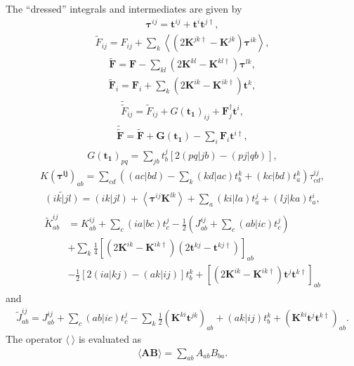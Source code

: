 The ``dressed'' integrals and intermediates are given by
\begin{align}
  \pmb{\tau}^{ij} = \pmb{t}^{ij}+\pmb{t}^i\pmb{t}^{j\dagger},
\end{align}
\begin{align}
  \tilde{F}_{ij} = F_{ij} + \sum_k \left\langle {(2\pmb{K}^{jk\dagger}-\pmb{K}^{jk})}\pmb{\tau}^{ik}\right\rangle,
\end{align}
\begin{align}
  \pmb{\tilde{F}} = \pmb{F} - {\sum_{kl}\left(2\pmb{K}^{kl}-\pmb{K}^{kl\dagger}\right)\pmb{\tau}^{lk}},
\end{align}
\begin{align}
  \pmb{\tilde{F}}_i = \pmb{F}_i + \sum_k\left(2\pmb{K}^{ik}-\pmb{K}^{ik\dagger}\right)\pmb{t}^k,
\end{align}
\begin{align}
  \tilde{\tilde{F}}_{ij} = \tilde{F}_{ij} + G(\pmb{t_1})_{ij} + {\pmb{F}_j^\dagger \pmb{t}^i},
\end{align}
\begin{align}
  \pmb{\tilde{\tilde{F}}} = \pmb{\tilde{F}} + \pmb{G(t_1)}-\sum_i{\pmb{F}_i \pmb{t}^{i\dagger}},
\end{align}
\begin{align}
  G(\pmb{t_1})_{pq} = \sum_{jb} t_b^j \left[2(pq|jb)-(pj|qb)\right],
\end{align}
\begin{align}
  K(\pmb{\tau^{ij}})_{ab} = \sum_{cd} \left((ac|bd) - \sum_k (kd|ac)t_b^k+(kc|bd)t^k_a \right)\tau^{ij}_{cd},
\end{align}
\begin{align}
  \widetilde{(ik|jl)} = (ik|jl) + \left\langle \pmb{\tau}^{ij}\pmb{K}^{lk}\right\rangle+\sum_a (ki|la)t_a^j+(lj|ka)t_a^i,
\end{align}
\begin{align}
  \begin{split}
    \tilde{K}^{ij}_{ab} &=
                         K^{ij}_{ab} + \sum_c (ia|bc)t_c^j-\frac{1}{2}\left(J^{ij}_{ab}+\sum_c(ab|ic)t_c^j\right)\\
                        &+\sum_k \frac{1}{4}\left[(2\pmb{K}^{ik}-\pmb{K}^{ik\dagger})(2\pmb{t}^{kj}-\pmb{t}^{kj\dagger})\right]_{ab}\\
                        &-\frac{1}{2}\left[ 2(ia|kj)-(ak|ij) \right]t^k_b+\left[ (2\pmb{K}^{ik}-\pmb{K}^{ik\dagger})\pmb{t}^j\pmb{t}^{k\dagger} \right]_{ab}
  \end{split}
\end{align}
and
\begin{align}
  \tilde{J}^{ij}_{ab}=J^{ij}_{ab}+\sum_c (ab|ic)t^j_c-\sum_k \frac{1}{2}\left( \pmb{K}^{ki}\pmb{t}^{jk}\right)_{ab}+(ak|ij)t^k_b+\left(\pmb{K}^{ki}\pmb{t}^j\pmb{t}^{k\dagger}\right)_{ab}.
\end{align}
The operator $\langle~\rangle$ is evaluated as
\begin{align}
  \langle\pmb{AB}\rangle = \sum_{ab} A_{ab} B_{ba}.
\end{align}


